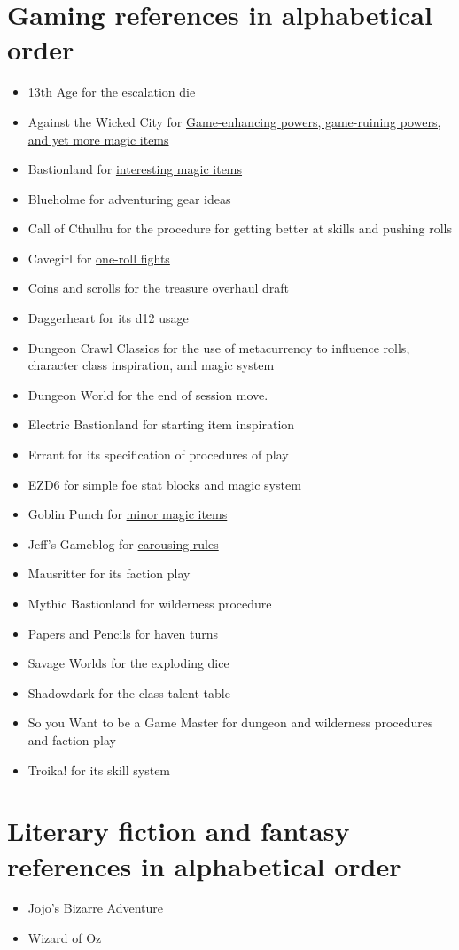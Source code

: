 \documentclass{article}
\begin{document}
\section{Gaming references in alphabetical order}
\label{app:references}
\begin{itemize}
    \item 13th Age for the escalation die
    \item Against the Wicked City for \href{https://udan-adan.blogspot.com/2021/10/game-enhancing-powers-game-ruining.html?utm_source=substack&utm_medium=email}{Game-enhancing powers, game-ruining powers, and yet more magic items}
    \item Bastionland for \href{https://www.bastionland.com/2009/07/100-interesting-magic-items-first-half.html}{interesting magic items}
    \item Blueholme for adventuring gear ideas
    \item Call of Cthulhu for the procedure for getting better at skills and pushing rolls
    \item Cavegirl for \href{https://cavegirlgames.blogspot.com/2018/03/one-roll-fights.html}{one-roll fights}
    \item Coins and scrolls for \href{https://coinsandscrolls.blogspot.com/2024/01/osr-treasure-overhaul.html}{the treasure overhaul draft}
    \item Daggerheart for its d12 usage
    \item Dungeon Crawl Classics for the use of metacurrency to influence rolls, character 
          class inspiration, and magic system
    \item Dungeon World for the end of session move.
    \item Electric Bastionland for starting item inspiration 
    \item Errant for its specification of procedures of play
    \item EZD6 for simple foe stat blocks and magic system
    \item Goblin Punch for \href{https://goblinpunch.blogspot.com/2015/01/d100-minor-magical-items.html}{minor magic items}
    \item Jeff's Gameblog for \href{https://jrients.blogspot.com/2008/12/party-like-its-999.html}{carousing rules}
    \item Mausritter for its faction play
    \item Mythic Bastionland for wilderness procedure
    \item Papers and Pencils for \href{https://www.paperspencils.com/the-haven-turn/}{haven turns}
    \item Savage Worlds for the exploding dice
    \item Shadowdark for the class talent table
    \item So you Want to be a Game Master for dungeon and wilderness procedures and faction play
    \item Troika! for its skill system
\end{itemize}

\section{Literary fiction and fantasy references in alphabetical order}
\label{app:n}
\begin{itemize}
    \item {Jojo's Bizarre Adventure}
    \item {Wizard of Oz}
\end{itemize}
\end{document}

